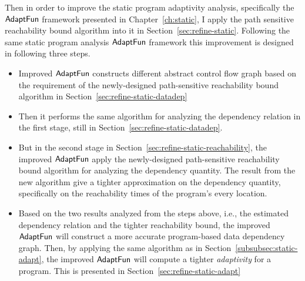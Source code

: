 \begin{enumerate}
    Then in order to improve the static program adaptivity analysis, specifically
    the $\textsf{AdaptFun}$ framework presented in Chapter~\ref{ch:static}, I apply the 
    path sensitive reachability bound algorithm into it in Section~\ref{sec:refine-static}.
    Following the same static program analysis $\textsf{AdaptFun}$ framework
this improvement is designed in following three steps.
\begin{itemize}
    \item Improved $\textsf{AdaptFun}$ constructs different abstract control flow graph based on the requirement of the newly-designed
    path-sensitive reachability bound algorithm in Section~\ref{sec:refine-static-datadep}
    \item Then it performs the same algorithm for analyzing the dependency relation in the first stage, still in Section~\ref{sec:refine-static-datadep}.
    \item But in the second stage in Section~\ref{sec:refine-static-reachability}, the improved $\textsf{AdaptFun}$ 
    apply the newly-designed  path-sensitive reachability bound algorithm for analyzing the dependency quantity.
    The result from the new algorithm 
    give a tighter approximation on the dependency quantity,
    specifically on the reachability times of the program's every location.
    \item Based on the two results analyzed from the steps above, 
    i.e., the estimated dependency relation and the tighter reachability bound, 
    the improved $\textsf{AdaptFun}$ will construct
a more accurate program-based data dependency graph.
Then, by applying the same algorithm as in Section~\ref{subsubsec:static-adapt}, 
the improved $\textsf{AdaptFun}$ will compute a tighter \emph{adaptivity} for a program.
This is presented in Section~\ref{sec:refine-static-adapt}%
\end{itemize}
\end{enumerate}

